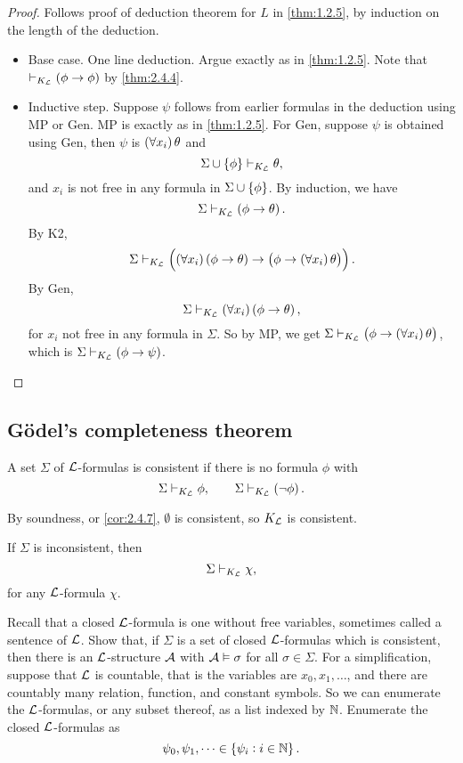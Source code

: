 \begin{proof}
Follows proof of deduction theorem for $ L $ in \ref{thm:1.2.5}, by induction on the length of the deduction.
\begin{itemize}
\item Base case. One line deduction. Argue exactly as in \ref{thm:1.2.5}. Note that $ \vdash_{K_\LL} \impb{\phi}{\phi} $ by \ref{thm:2.4.4}.
\item Inductive step. Suppose $ \psi $ follows from earlier formulas in the deduction using MP or Gen. MP is exactly as in \ref{thm:1.2.5}. For Gen, suppose $ \psi $ is obtained using Gen, then $ \psi $ is $ \fab{x_i}\theta $ and
$$ \Sigma \cup \cbr{\phi} \vdash_{K_\LL} \theta, $$
and $ x_i $ is not free in any formula in $ \Sigma \cup \cbr{\phi} $. By induction, we have
$$ \Sigma \vdash_{K_\LL} \impb{\phi}{\theta}. $$
By K2,
$$ \Sigma \vdash_{K_\LL} \impb{\fab{x_i}\impb{\phi}{\theta}}{\impb{\phi}{\fab{x_i}\theta}}. $$
By Gen,
$$ \Sigma \vdash_{K_\LL} \fab{x_i}\impb{\phi}{\theta}, $$
for $ x_i $ not free in any formula in $ \Sigma $. So by MP, we get $ \Sigma \vdash_{K_\LL} \impb{\phi}{\fab{x_i}\theta} $, which is $ \Sigma \vdash_{K_\LL} \impb{\phi}{\psi} $.
\end{itemize}
\end{proof}


\subsection{G\"odel's completeness theorem}

\begin{definition}
A set $ \Sigma $ of $ \LL $-formulas is consistent if there is no formula $ \phi $ with
$$ \Sigma \vdash_{K_\LL} \phi, \qquad \Sigma \vdash_{K_\LL} \notb{\phi}. $$
\end{definition}

By soundness, or \ref{cor:2.4.7}, $ \emptyset $ is consistent, so $ K_\LL $ is consistent.

\begin{remark*}
If $ \Sigma $ is inconsistent, then
$$ \Sigma \vdash_{K_\LL} \chi, $$
for any $ \LL $-formula $ \chi $.
\end{remark*}

Recall that a closed $ \LL $-formula is one without free variables, sometimes called a sentence of $ \LL $. Show that, if $ \Sigma $ is a set of closed $ \LL $-formulas which is consistent, then there is an $ \LL $-structure $ \AA $ with $ \AA \vDash \sigma $ for all $ \sigma \in \Sigma $. For a simplification, suppose that $ \LL $ is countable, that is the variables are $ x_0, x_1, \dots $, and there are countably many relation, function, and constant symbols. So we can enumerate the $ \LL $-formulas, or any subset thereof, as a list indexed by $ \N $. Enumerate the closed $ \LL $-formulas as
$$ \psi_0, \psi_1, \dots \in \cbr{\psi_i : i \in \N}. $$

